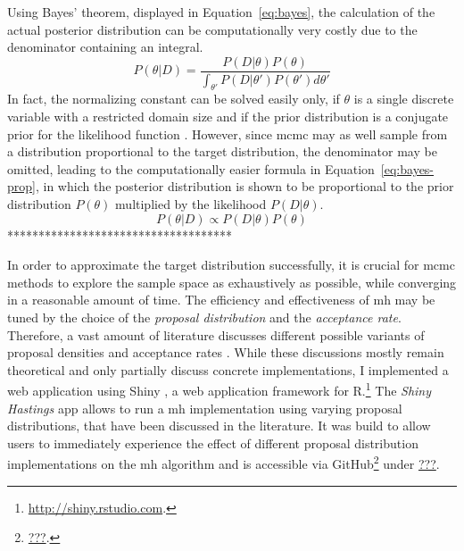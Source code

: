 \documentclass[11pt]{article}
\begin{document}
Using Bayes' theorem, displayed in Equation~\ref{eq:bayes}, the calculation of the actual posterior distribution can be computationally very costly due to the denominator containing an integral.
\begin{equation}\label{eq:bayes}
P( \theta | D ) =  \frac{P( D | \theta ) P( \theta )}{ \int_{\theta'} P( D | \theta' ) P( \theta' ) d \theta'}
\end{equation}
In fact, the normalizing constant can be solved easily only, if $\theta$ is a single discrete variable with a restricted domain size and if the prior distribution is a conjugate prior for the likelihood function \parencite{???}.
However, since \gls{mcmc} may as well sample from a distribution proportional to the target distribution, the denominator may be omitted, leading to the computationally easier formula in Equation~\ref{eq:bayes-prop}, in which the posterior distribution is shown to be proportional to the prior distribution $P( \theta )$ multiplied by the likelihood $P( D | \theta )$.
\begin{equation}\label{eq:bayes-prop}
P( \theta | D ) \propto  P( D | \theta ) P( \theta )
\end{equation}
************************************

In order to approximate the target distribution successfully, it is crucial for \gls{mcmc} methods to explore the sample space as exhaustively as possible, while converging in a reasonable amount of time. The efficiency and effectiveness of \gls{mh} may be tuned by the choice of the \textit{proposal distribution} and the \textit{acceptance rate}. Therefore, a vast amount of literature discusses different possible variants of proposal densities and acceptance rates \parencite[e.g.][]{liu2001,jackman2009}. 
While these discussions mostly remain theoretical and only partially discuss concrete implementations, I implemented a web application using Shiny \parencite{shiny}, a web application framework for R.\footnote{\url{http://shiny.rstudio.com}.} The \textit{Shiny Hastings} app allows to run a \gls{mh} implementation using varying proposal distributions, that have been discussed in the literature. It was build to allow users to immediately experience the effect of different proposal distribution implementations on the \gls{mh} algorithm and is accessible via GitHub\footnote{\url{???}.} under \url{???}.
\end{document}
